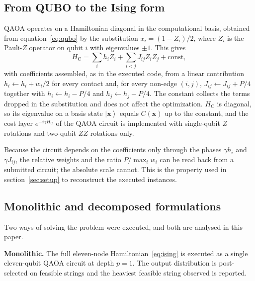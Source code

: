 \documentclass{iopjournal}
\newcommand{\ket}[1]{\left|#1\right\rangle}
\newcommand{\Hc}{H_{\mathrm{C}}}
\begin{document}
\subsection{From QUBO to the Ising form}
\label{sec:ising}
QAOA operates on a Hamiltonian diagonal in the computational basis, obtained from equation~\eqref{eq:qubo} by the substitution $x_i = (1 - Z_i)/2$, where $Z_i$ is the Pauli-$Z$ operator on qubit $i$ with eigenvalues $\pm 1$. This gives
\begin{equation}
\label{eq:ising}
\Hc = \sum_{i} h_i Z_i + \sum_{i<j} J_{ij} Z_i Z_j + \text{const},
\end{equation}
with coefficients assembled, as in the executed code, from a linear contribution $h_i \leftarrow h_i + w_i/2$ for every contact and, for every non-edge $(i,j)$, $J_{ij} \leftarrow J_{ij} + P/4$ together with $h_i \leftarrow h_i - P/4$ and $h_j \leftarrow h_j - P/4$. The constant collects the terms dropped in the substitution and does not affect the optimization. $\Hc$ is diagonal, so its eigenvalue on a basis state $\ket{\mathbf{x}}$ equals $C(\mathbf{x})$ up to the constant, and the cost layer $e^{-i\gamma \Hc}$ of the QAOA circuit is implemented with single-qubit $Z$ rotations and two-qubit $ZZ$ rotations only.

Because the circuit depends on the coefficients only through the phases $\gamma h_i$ and $\gamma J_{ij}$, the relative weights and the ratio $P/\max_i w_i$ can be read back from a submitted circuit; the absolute scale cannot. This is the property used in section~\ref{sec:setup} to reconstruct the executed instances.

\subsection{Monolithic and decomposed formulations}
\label{sec:cases}
Two ways of solving the problem were executed, and both are analysed in this paper.

\textbf{Monolithic.} The full eleven-node Hamiltonian~\eqref{eq:ising} is executed as a single eleven-qubit QAOA circuit at depth $p=1$. The output distribution is post-selected on feasible strings and the heaviest feasible string observed is reported.
\end{document}
